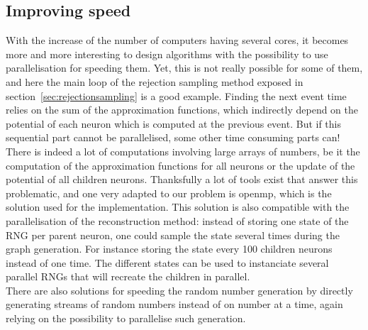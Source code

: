 \documentclass{article}
\begin{document}
	\subsection{Improving speed}
		With the increase of the number of computers having several cores, it becomes more and more interesting to design algorithms with the possibility to use parallelisation for speeding them. Yet, this is not really possible for some of them, and here the main loop of the rejection sampling method exposed in section~\ref{sec:rejectionsampling} is a good example. Finding the next event time relies on the sum of the approximation functions, which indirectly depend on the potential of each neuron which is computed at the previous event. But if this sequential part cannot be parallelised, some other time consuming parts can!\\\indent
		There is indeed a lot of computations involving large arrays of numbers, be it the computation of the approximation functions for all neurons or the update of the potential of all children neurons. Thanksfully a lot of tools exist that answer this problematic, and one very adapted to our problem is openmp, which is the solution used for the implementation. This solution is also compatible with the parallelisation of the reconstruction method: instead of storing one state of the RNG per parent neuron, one could sample the state several times during the graph generation. For instance storing the state every 100 children neurons instead of one time. The different states can be used to instanciate several parallel RNGs that will recreate the children in parallel.\\\indent 
		There are also solutions for speeding the random number generation by directly generating streams of random numbers instead of on number at a time, again relying on the possibility to parallelise such generation.\\
		
\end{document}

